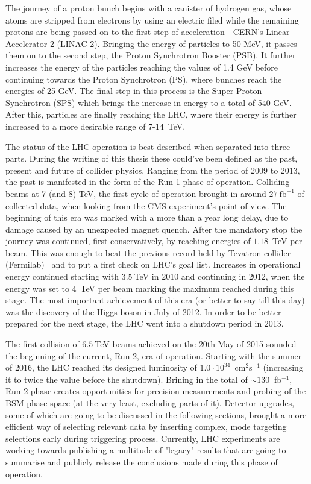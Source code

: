 \hspace{10pt} The journey of a proton bunch begins with a canister of hydrogen gas, whose atoms are stripped from electrons by using an electric filed while the remaining protons are being passed on to the first step of acceleration - CERN's Linear Accelerator 2 (LINAC 2). Bringing the energy of particles to 50 MeV, it passes them on to the second step, the Proton Synchrotron Booster (PSB).  It further increases the energy of the particles reaching the values of 1.4 GeV before continuing towards the Proton Synchrotron (PS), where bunches reach the energies of 25 GeV. The final step in this process is the Super Proton Synchrotron (SPS) which brings the increase in energy to a total of 540 GeV. After this, particles are finally reaching the LHC, where their energy is further increased to a more desirable range of 7-14~TeV.


\hspace{10pt} The status of the LHC operation is best described when separated into three parts. During the writing of this thesis these could've been defined as the past, present and future of collider physics. Ranging from the period of 2009 to 2013, the past is manifested in the form of the Run 1 phase of operation. Colliding beams at 7 (and 8) TeV, the first cycle of operation brought in around $27~\text{fb}^{-1}$ of collected data, when looking from the CMS experiment's point of view. The beginning of this era was marked with a more than a year long delay, due to damage caused by an unexpected magnet quench. After the mandatory stop the journey was continued, first conservatively, by reaching energies of $1.18$~TeV per beam. This was enough to beat the previous record held by Tevatron collider (Fermilab)~\cite{tevatron_summary} and to put a first check on LHC's goal list. Increases in operational energy continued starting with $3.5~$TeV in 2010 and continuing in 2012, when the energy was set to $4$~TeV per beam marking the maximum reached during this stage. The most important achievement of this era (or better to say till this day) was the discovery of the Higgs boson in July of 2012. In order to be better prepared for the next stage, the LHC went into a shutdown period in 2013. 

\hspace{10pt} The first collision of $6.5~$TeV beams achieved on the 20th May of 2015 sounded the beginning of the current, Run 2, era of operation. Starting with the summer of 2016, the LHC reached its designed luminosity of $1.0\cdot10^{34}$~cm$^2$s$^{-1}$ (increasing it to twice the value before the shutdown). Brining in the total of $\sim130~$ fb$^{-1}$, Run 2 phase creates opportunities for precision measurements and probing of the BSM phase space (at the very least, excluding parts of it). Detector upgrades, some of which are going to be discussed in the following sections, brought a more efficient way of selecting relevant data by inserting complex, mode targeting selections early during triggering process. Currently, LHC experiments are working towards publishing a multitude of "legacy" results that are going to summarise and publicly release the conclusions made during this phase of operation.

